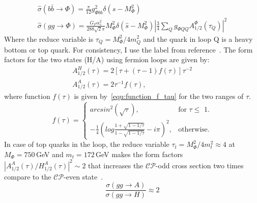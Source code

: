 \begin{equation}\label{equ:heavy_higgs_prod_xsec}
\begin{split}
\hat{\sigma}\left(b\bar{b}\rightarrow\Phi\right) = \frac{\pi}{12}g^{2}_{\Phi bb}\delta\left(\hat{s}-M^{2}_{\Phi}\right)\\
\hat{\sigma}\left(gg\rightarrow\Phi\right) = \frac{G_{F}\alpha^{2}_{s}}{288\sqrt{2}\pi}M^{2}_{\Phi}\delta\left(\hat{s}-M^{2}_{\Phi}\right)\left|\frac{3}{4} \sum\limits_{Q}g_{\Phi QQ}A_{1/2}^{\Phi}\left(\tau_{Q}\right)\right|^{2}
\end{split}
\end{equation}
Where the reduce variable is $\tau_{Q} = M_{\Phi}^{2}/4m_{Q}^{2}$ and the quark in loop Q is a heavy bottom or top quark. For consistency, I use the label from reference~\cite{Djouadi:2015jea}. The form factors for the two states (H/A) using fermion loops are given by:
\begin{equation}\label{equ:form_factors}
\begin{split}
A^{H}_{1/2}\left(\tau\right) = 2\left[\tau+\left(\tau-1\right)f\left(\tau\right)\right]\tau^{-2}\\
A^{A}_{1/2}\left(\tau\right) = 2\tau^{-1}f\left(\tau\right),
\end{split}
\end{equation} 
where function $f(\tau)$ is given by~\ref{equ:function_f_tau} for the two ranges of $\tau$.
\begin{equation}\label{equ:function_f_tau}
f(\tau) = \begin{cases}
    arcsin^{2}(\sqrt{\tau}), & \text{for $\tau \leq $ 1}.\\
    -\frac{1}{4}\left( log\frac{1+\sqrt{1-1/\tau}}{1-\sqrt{1-1/\tau}}-i\pi \right)^{2}, & \text{otherwise}.
  \end{cases}
\end{equation}
In case of top quarks in the loop, the reduce variable $\tau_{t} = M_{\Phi}^{2}/4m_{t}^{2} \approx 4$ at $M_{\Phi}=750$\,GeV and $m_{t}=172$\,GeV makes the form factors $\left|A^{A}_{1/2}\left(\tau\right)/H^{A}_{1/2}\left(\tau\right)\right|^{2} \sim 2$ that increases the $\mathcal{CP}$-odd cross section two times compare to the $\mathcal{CP}$-even state~\cite{Djouadi:2016eyy}.
\begin{equation}
\frac{\sigma\left(gg\rightarrow A\right)}{\sigma\left(gg\rightarrow H\right)}\approx 2
\end{equation}
